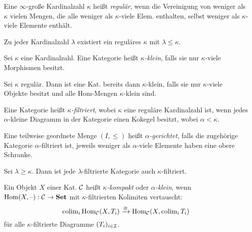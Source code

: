 \documentclass{cheat-sheet}
\begin{document}
\begin{defn}
  Eine $\infty$-große Kardinalzahl $\kappa$ heißt \emph{regulär}, wenn die Vereinigung von weniger als $\kappa$ vielen Mengen, die alle weniger als $\kappa$-viele Elem. enthalten, selbst weniger als $\kappa$-viele Elemente enthält.
\end{defn}

\begin{bem}
  Zu jeder Kardinalzahl $\lambda$ existiert ein reguläres $\kappa$ mit $\lambda \leq \kappa$.
\end{bem}

\begin{defn}
  Sei $\kappa$ eine Kardinalzahl. Eine Kategorie heißt \emph{$\kappa$-klein}, falls sie nur $\kappa$-viele Morphismen besitzt.
\end{defn}

\begin{bem}
  Sei $\kappa$ regulär. Dann ist eine Kat. bereits dann $\kappa$-klein, falls sie nur $\kappa$-viele Objekte besitzt und alle Hom-Mengen $\kappa$-klein sind.
\end{bem}

\begin{defn}
  Eine Kategorie heißt \emph{$\kappa$-filtriert}, wobei $\kappa$ eine reguläre Kardinalzahl ist, wenn jedes $\alpha$-kleine Diagramm in der Kategorie einen Kokegel besitzt, wobei $\alpha < \kappa$.
\end{defn}

\begin{defn}
  Eine teilweise geordnete Menge $(I, \leq)$ heißt \emph{$\alpha$-gerichtet}, falls die zugehörige Kategorie $\alpha$-filtriert ist, \dh{} jeweils weniger als $\alpha$-viele Elemente haben eine obere Schranke.
\end{defn}

\begin{bem}
  Sei $\lambda \geq \kappa$. Dann ist jede $\lambda$-filtrierte Kategorie auch $\kappa$-filtriert.
\end{bem}

\begin{defn}
  Ein Objekt $X$ einer Kat. $\mathcal{C}$ heißt \emph{$\kappa$-kompakt} oder \emph{$\alpha$-klein}, wenn $\operatorname{Hom}(X, \text{--}) : \mathcal{C} \to \mathbf{Set}$ mit $\kappa$-filtrierten Kolimiten vertauscht:
  \[
    \operatorname{colim}_i \operatorname{Hom}_{\mathcal{C}}(X, T_i) \xrightarrow{\cong} \operatorname{Hom}_{\mathcal{C}}(X, \operatorname{colim}_i T_i)
  \]
  für alle $\kappa$-filtrierte Diagramme $(T_i)_{i \in \mathcal{I}}$.
\end{defn}
\end{document}
